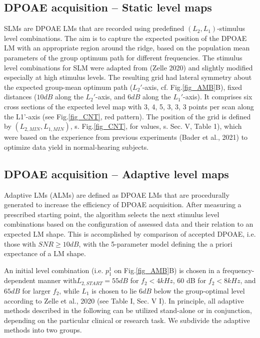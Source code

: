 \documentclass[journal,twoside,web]{ieeecolor2}
\begin{document}
\subsection{DPOAE acquisition – Static level maps}
SLMs are DPOAE LMs that are recorded using predefined $(L_2, L_1)$-stimulus level combinations.
The aim is to capture the expected position of the DPOAE LM with an appropriate region around the ridge, based on the population mean parameters of the group optimum path for different frequencies.
The stimulus level combinations for SLM were adapted from (Zelle 2020) and slightly modified especially at high stimulus levels.
The resulting grid had lateral symmetry about the expected group-mean optimum path ($L_2'$-axis, cf. Fig.\ref{fig_AMB}B), fixed distances ($10 dB$ along the $L_2'$-axis, and $6 dB$ along the $L_1'$-axis).
It comprises six cross sections of the expected level map with 3, 4, 5, 3, 3, 3 points per scan along the L1'-axis (see Fig.\ref{fig_CNT}, red pattern).
The position of the grid is defined by $(L_{2,MIN} , L_{1,MIN})$, s. Fig.\ref{fig_CNT}, for values,  s. Sec. V, Table 1), which were based on the experience from previous experiments (Bader et al., 2021) to optimize data yield in normal-hearing subjects.

\subsection{DPOAE acquisition – Adaptive level maps}
Adaptive LMs (ALMs) are defined as DPOAE LMs that are procedurally generated to increase the efficiency of DPOAE acquisition.
After measuring a prescribed starting point, the algorithm selects the next stimulus level combinations based on the configuration of assessed data and their relation to an expected LM shape.
   This is accomplished by comparison of accepted DPOAE, i.e.
those with $SNR \ge 10 dB$, with the 5-parameter model defining the a priori expectance of a LM shape.

An initial level combination (i.e.
$p_1^1$ on Fig.\ref{fig_AMB}B) is chosen in a frequency-dependent manner with$L_{2,START} = 55 dB$ for $f_2 < 4 kHz$, 60 dB for $f_2 < 8 kHz$, and $65 dB$ for larger $f_2$, while $L_1$ is chosen to lie $6 dB$ below the group-optimal level according to Zelle et al., 2020 (see Table I, Sec. V  I).
 In principle, all adaptive methods described in the following can be utilized stand-alone or in conjunction, depending on the particular clinical or research task.
We subdivide the adaptive methods into two groups.
\end{document}
